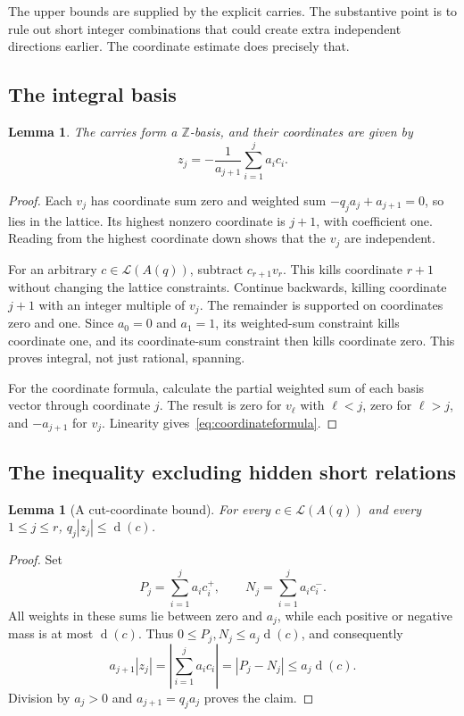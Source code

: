\documentclass[11pt]{article}
\numberwithin{equation}{section}
\newtheorem{lemma}[theorem]{Lemma}
\theoremstyle{definition}
\theoremstyle{remark}\newtheorem{remark}[theorem]{Remark}
\newcommand{\Z}{\mathbb Z}\newcommand{\N}{\mathbb N}
\newcommand{\Latt}{\mathcal L}
\newcommand{\dgr}{\operatorname{d}}
\begin{document}
The upper bounds are supplied by the explicit carries.  The substantive
point is to rule out short integer combinations that could create extra
independent directions earlier.  The coordinate estimate does precisely that.

\subsection{The integral basis}

\begin{lemma}\label{lem:basis}
The carries form a $\Z$-basis, and their coordinates are given by
\begin{equation}\label{eq:coordinateformula}
 z_j=-\frac{1}{a_{j+1}}\sum_{i=1}^{j}a_i c_i.
\end{equation}
\end{lemma}
\begin{proof}
Each $v_j$ has coordinate sum zero and weighted sum
$-q_j a_j+a_{j+1}=0$, so lies in the lattice.  Its highest nonzero
coordinate is $j+1$, with coefficient one.  Reading from the highest
coordinate down shows that the $v_j$ are independent.

For an arbitrary $c\in\Latt(A(q))$, subtract $c_{r+1}v_r$.  This kills
coordinate $r+1$ without changing the lattice constraints.  Continue
backwards, killing coordinate $j+1$ with an integer multiple of $v_j$.
The remainder is supported on coordinates zero and one.  Since $a_0=0$
and $a_1=1$, its weighted-sum constraint kills coordinate one, and its
coordinate-sum constraint then kills coordinate zero.  This proves integral,
not just rational, spanning.

For the coordinate formula, calculate the partial weighted sum of each
basis vector through coordinate $j$.  The result is zero for $v_\ell$ with
$\ell<j$, zero for $\ell>j$, and $-a_{j+1}$ for $v_j$.
Linearity gives~\eqref{eq:coordinateformula}.
\end{proof}

\subsection{The inequality excluding hidden short relations}

\begin{lemma}[A cut-coordinate bound]\label{lem:bound}
For every $c\in\Latt(A(q))$ and every $1\le j\le r$,
$q_j|z_j|\le\dgr(c)$.
\end{lemma}
\begin{proof}
Set
\[
 P_j=\sum_{i=1}^j a_i c_i^+,
 \qquad N_j=\sum_{i=1}^j a_i c_i^-.
\]
All weights in these sums lie between zero and $a_j$, while each positive
or negative mass is at most $\dgr(c)$.  Thus
$0\le P_j,N_j\le a_j\dgr(c)$, and consequently
\[
 a_{j+1}|z_j|
 =\left|\sum_{i=1}^j a_i c_i\right|
 =|P_j-N_j|
 \le a_j\dgr(c).
\]
Division by $a_j>0$ and $a_{j+1}=q_j a_j$ proves the claim.
\end{proof}
\end{document}
